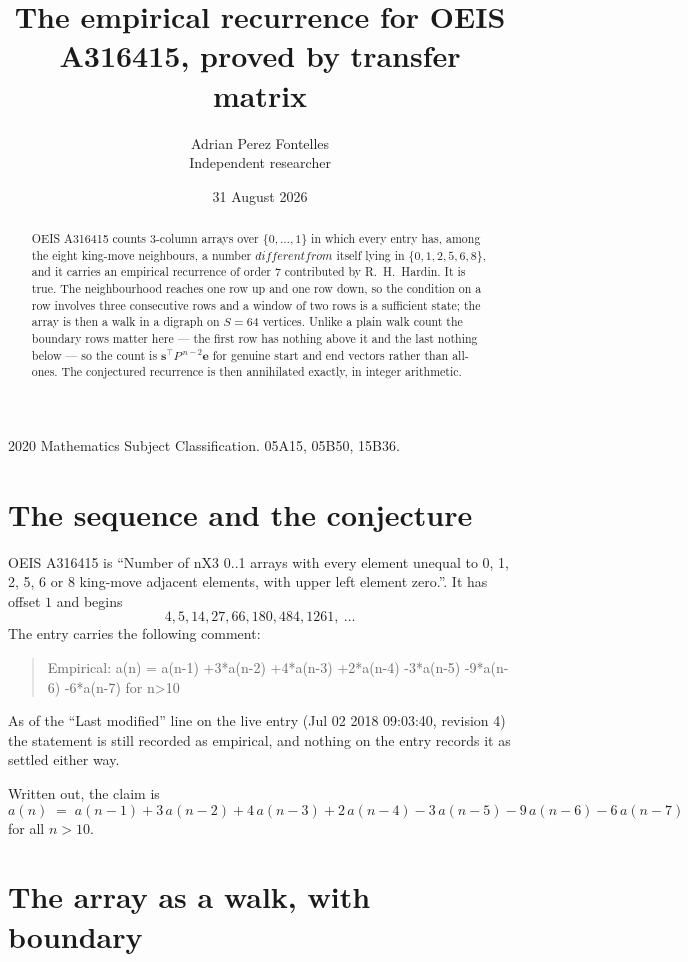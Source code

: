 \documentclass[11pt,a4paper]{article}
\title{The empirical recurrence for OEIS A316415, proved by transfer matrix}
\author{Adrian Perez Fontelles\\ \small Independent researcher}
\date{31 August 2026}
\theoremstyle{plain}
\theoremstyle{definition}
\begin{document}
\maketitle

\begin{abstract}
OEIS A316415 counts $3$-column arrays over $\{0,\dots,1\}$ in which every entry has,
among the eight king-move neighbours, a number $different from$ itself lying in $\{0,1,2,5,6,8\}$, and it carries an empirical
recurrence of order $7$ contributed by R.~H.~Hardin. It is true. The neighbourhood
reaches one row up and one row down, so the condition on a row involves three consecutive
rows and a window of two rows is a sufficient state; the array is then a walk in a digraph
on $S=64$ vertices. Unlike a plain walk count the boundary rows matter here --- the first
row has nothing above it and the last nothing below --- so the count is
$\mathbf{s}^{\!\top}P^{\,n-2}\mathbf{e}$ for genuine start and end vectors rather than
all-ones. The conjectured recurrence is then annihilated exactly, in integer arithmetic.
\end{abstract}

\noindent\small 2020 Mathematics Subject Classification. 05A15, 05B50, 15B36.\normalsize

\section{The sequence and the conjecture}

OEIS A316415 is ``Number of nX3 0..1 arrays with every element unequal to 0, 1, 2, 5, 6 or 8 king-move adjacent elements, with upper left element zero.''. It has offset
$1$ and begins
\[
4, 5, 14, 27, 66, 180, 484, 1261,\ \dots
\]
The entry carries the following comment:
\begin{quote}\small
Empirical: a(n) = a(n-1) +3*a(n-2) +4*a(n-3) +2*a(n-4) -3*a(n-5) -9*a(n-6) -6*a(n-7) for n>10
\end{quote}
As of the ``Last modified'' line on the live entry (Jul 02 2018 09:03:40, revision
4) the statement is still recorded as empirical, and nothing on the entry
records it as settled either way.

Written out, the claim is
\begin{equation}\label{eq:conj}
a(n)\;=\;a(n-1) + 3\,a(n-2) + 4\,a(n-3) + 2\,a(n-4) - 3\,a(n-5) - 9\,a(n-6) - 6\,a(n-7)
\end{equation}
for all $n>10$.

\section{The array as a walk, with boundary}
\end{document}
